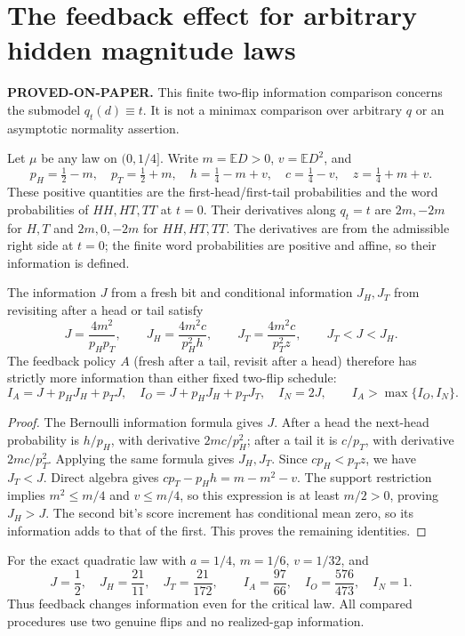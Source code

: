 \section{The feedback effect for arbitrary hidden magnitude laws}
\label{sec:feedback-local-information}
\noindent\textbf{PROVED-ON-PAPER.} This finite two-flip information
comparison concerns the submodel $q_t(d)\equiv t$. It is not a minimax
comparison over arbitrary $q$ or an asymptotic normality assertion.

Let $\mu$ be any law on $(0,1/4]$. Write
$m=\mathbb E D>0$, $v=\mathbb E D^2$, and
\[
 p_H=\tfrac12-m,\quad p_T=\tfrac12+m,\quad
 h=\tfrac14-m+v,\quad c=\tfrac14-v,\quad z=\tfrac14+m+v.
\]
These positive quantities are the first-head/first-tail probabilities and
the word probabilities of $HH,HT,TT$ at $t=0$. Their derivatives along
$q_t=t$ are $2m,-2m$ for $H,T$ and $2m,0,-2m$ for $HH,HT,TT$.
The derivatives are from the admissible right side at $t=0$; the finite
word probabilities are positive and affine, so their information is defined.

\begin{proposition}\label{feedback:information}
The information $J$ from a fresh bit and conditional information $J_H,J_T$
from revisiting after a head or tail satisfy
\[
 J=\frac{4m^2}{p_Hp_T},\qquad
 J_H=\frac{4m^2c}{p_H^2h},\qquad
 J_T=\frac{4m^2c}{p_T^2z},\qquad J_T<J<J_H.
\]
The feedback policy $A$ (fresh after a tail, revisit after a head) therefore
has strictly more information than either fixed two-flip schedule:
\[
 I_A=J+p_HJ_H+p_TJ,\quad I_O=J+p_HJ_H+p_TJ_T,\quad I_N=2J,
 \qquad I_A>\max\{I_O,I_N\}.
\]
\end{proposition}
\begin{proof}
The Bernoulli information formula gives $J$. After a head the next-head
probability is $h/p_H$, with derivative $2mc/p_H^2$; after a tail it is
$c/p_T$, with derivative $2mc/p_T^2$. Applying the same formula gives
$J_H,J_T$. Since $cp_H<p_Tz$, we have $J_T<J$.
Direct algebra gives $cp_T-p_Hh=m-m^2-v$.
The support restriction implies $m^2\le m/4$ and $v\le m/4$, so this
expression is at least $m/2>0$, proving $J_H>J$.
The second bit's score increment has conditional mean zero, so its
information adds to that of the first. This proves the remaining identities.
\end{proof}

For the exact quadratic law with $a=1/4$, $m=1/6$, $v=1/32$, and
\[
 J=\frac12,\quad J_H=\frac{21}{11},\quad J_T=\frac{21}{172},
 \qquad I_A=\frac{97}{66},\quad I_O=\frac{576}{473},\quad I_N=1.
\]
Thus feedback changes information even for the critical law. All compared
procedures use two genuine flips and no realized-gap information.

